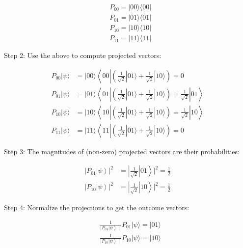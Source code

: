 \documentclass[main.tex]{subfiles}
\begin{document}
    $$
    \begin{aligned}
    &P_{00}=|00\rangle\langle 00| \\
    &P_{01}=|01\rangle\langle 01| \\
    &P_{10}=|10\rangle\langle 10| \\
    &P_{11}=|11\rangle\langle 11|
    \end{aligned}
    $$
    
    Step 2: Use the above to compute projected vectors:
    
    $$
    \begin{aligned}
    P_{00}|\psi\rangle &=|00\rangle\left\langle0 0 \left|\left(\frac{1}{\sqrt{2}}|01\rangle+\frac{1}{\sqrt{2}}|10\rangle\right)=0\right.\right.\\
    P_{01}|\psi\rangle &=|01\rangle\left\langle 01\left|\left(\frac{1}{\sqrt{2}}|01\rangle+\frac{1}{\sqrt{2}}|10\rangle\right)=\frac{1}{\sqrt{2}}\right| 01\right\rangle \\
    P_{10}|\psi\rangle &=|10\rangle\left\langle 10\left|\left(\frac{1}{\sqrt{2}}|01\rangle+\frac{1}{\sqrt{2}}|10\rangle\right)=\frac{1}{\sqrt{2}}\right| 10\right\rangle \\
    P_{11}|\psi\rangle &=|11\rangle\left\langle1 1 \left|\left(\frac{1}{\sqrt{2}}|01\rangle+\frac{1}{\sqrt{2}}|10\rangle\right)=0\right.\right.
    \end{aligned}
    $$
    
    Step 3: The magnitudes of (non-zero) projected vectors are their probabilities:
    
    $$
    \begin{aligned}
    \left.\left|P_{01}\right| \psi\right\rangle\left.\right|^{2} &\left.=\left|\frac{1}{\sqrt{2}}\right| 01\right\rangle\left.\right|^{2}=\frac{1}{2} \\
    \left.\left|P_{10}\right| \psi\right\rangle\left.\right|^{2} &\left.=\left|\frac{1}{\sqrt{2}}\right| 10\right\rangle\left.\right|^{2}=\frac{1}{2}
    \end{aligned}
    $$
    
    Step 4: Normalize the projections to get the outcome vectors:
    
    $$
    \begin{aligned}
    &\frac{1}{\left.\left|P_{01}\right| \psi\right\rangle \mid} P_{01}|\psi\rangle=|01\rangle \\
    &\frac{1}{\left.\left|P_{10}\right| \psi\right\rangle \mid} P_{10}|\psi\rangle=|10\rangle
    \end{aligned}
    $$
    
\end{document}
